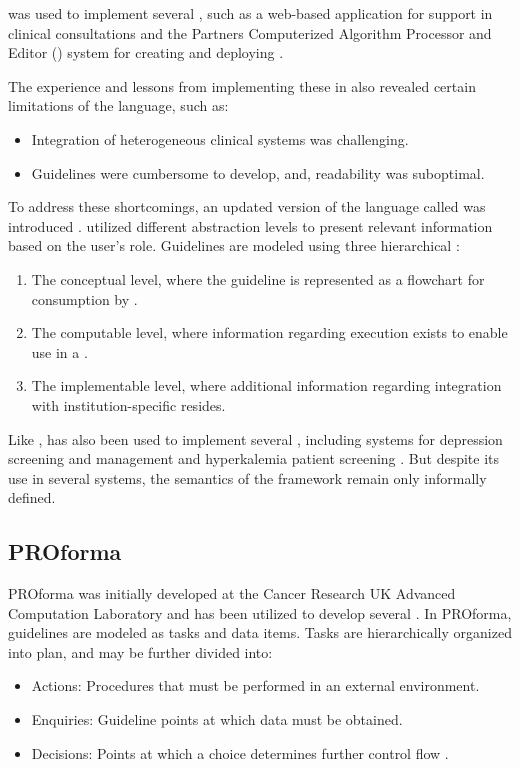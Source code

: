 \GLIF{} was used to implement several \CDSSs{}, such as a web-based
application for support in clinical consultations \cite{BoxwalaAMIA99} and
the Partners Computerized Algorithm Processor and Editor (\PCAPE{}) system
for creating and deploying \BPGs{} \cite{ZielstorffAMIA98}.

The experience and lessons from implementing these \CDSSs{} in
\GLIF{} also revealed certain limitations of the language, such as:
\begin{itemize}
  \item Integration of heterogeneous clinical systems was challenging.
  \item Guidelines were cumbersome to develop, and, readability was suboptimal.
\end{itemize}

To address these shortcomings, an updated version of the language called
 was introduced  \cite{PelegAMIA00}.  utilized different
abstraction levels to present relevant information based on the user's role.
Guidelines are modeled using three hierarchical :
\begin{enumerate}[label=\roman*.]
  \item The conceptual level, where the guideline is represented as
    a flowchart for consumption by \HCPs{}.
  \item The computable level, where information regarding
    execution exists to enable use in a \CDSS{}.
  \item The implementable level, where additional information
    regarding integration with institution-specific \EHRs{} resides.
\end{enumerate}
Like \GLIF{},  has also  been used to implement several \CDSSs{}, including
systems for depression screening and management \cite{ChoiJMI07} and
hyperkalemia patient screening \cite{WangBook04}. But despite its use
in several systems, the semantics of the \GLIF{} framework remain only informally
defined.


\subsection{PROforma}\label{sec:proforma}

PROforma was initially developed at the Cancer Research UK Advanced Computation
Laboratory and has been utilized to develop several \CDSSs{} \cite{ClerqAIM03}.
In PROforma, guidelines are modeled as tasks and data items. Tasks are
hierarchically organized into plan, and may be further divided into:
\begin{itemize}
  \item Actions: Procedures that must be performed in an external environment.
  \item Enquiries: Guideline points at which data must be obtained.
  \item Decisions: Points at which a choice determines further control flow
    \cite{SuttonAMIA03}.
\end{itemize}

